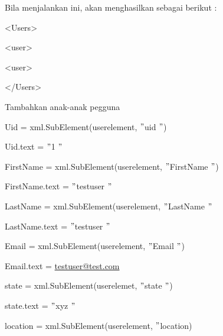 \documentclass{wileySix}
\begin{document}
\begin{myEnumerate}
{\noindent 
Bila menjalankan ini, akan menghasilkan sebagai berikut : \par
\noindent 
{\fontsize{10pt}{10pt}\selectfont <Users>} \par
\noindent 
{\fontsize{10pt}{10pt}\selectfont  \hspace*{0.5in} <user>} \par
\noindent 
{\fontsize{10pt}{10pt}\selectfont  \hspace*{0.5in} <user>} \par
\noindent 
{\fontsize{10pt}{10pt}\selectfont </Users>} \par
\vspace{10pt}
\vspace{10pt}
\vspace{10pt}
\noindent 
Tambahkan anak-anak pegguna \par
\vspace{10pt}
\noindent 
{\fontsize{10pt}{10pt}\selectfont Uid = xml.SubElement(userelement,  $ " $uid $ " $)} \par
\noindent 
{\fontsize{10pt}{10pt}\selectfont Uid.text =  $ " $1 $ " $} \par
\vspace{10pt}
\noindent 
{\fontsize{10pt}{10pt}\selectfont FirstName = xml.SubElement(userelement,  $ " $FirstName $ " $)} \par
\noindent 
{\fontsize{10pt}{10pt}\selectfont FirstName.text =  $ " $testuser $ " $} \par
\vspace{10pt}
\noindent 
{\fontsize{10pt}{10pt}\selectfont LastName = xml.SubElement(userelement,  $ " $LastName $ " $} \par
\noindent 
{\fontsize{10pt}{10pt}\selectfont LastName.text =  $ " $testuser $ " $} \par
\vspace{10pt}
\noindent 
{\fontsize{10pt}{10pt}\selectfont Email = xml.SubElement(userelement,  $ " $Email $ " $)} \par
\noindent 
{\fontsize{10pt}{10pt}\selectfont Email.text = \href{mailto:testuser@test.com}{testuser@test.com}
} \par
\vspace{10pt}
\noindent 
{\fontsize{10pt}{10pt}\selectfont state = xml.SubElement(userelemet,  $ " $state $ " $)} \par
\noindent 
{\fontsize{10pt}{10pt}\selectfont state.text =  $ " $xyz $ " $} \par
\vspace{10pt}
\noindent 
{\fontsize{10pt}{10pt}\selectfont location = xml.SubElement(userelement,  $ " $location)} \par
}
\end{myEnumerate}
\end{document}
